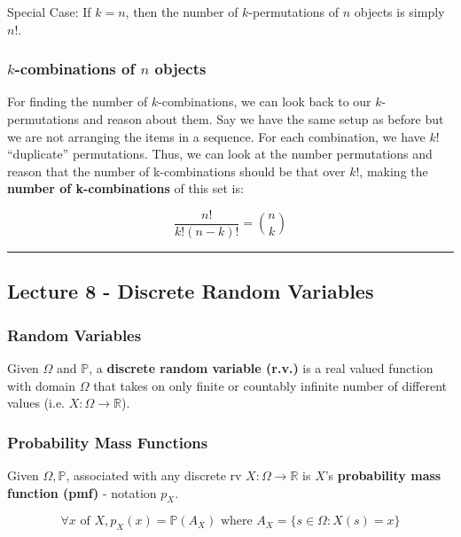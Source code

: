 \documentclass{article}
\begin{document}
Special Case: If $k = n$, then the number of $k$-permutations of $n$
objects is simply $n!$.

\bigskip
\subsubsection{$k$-combinations of $n$ objects}

For finding the number of $k$-combinations, we can look back to our
$k$-permutations and reason about them. Say we have the same setup as
before but we are not arranging the items in a sequence. For each
combination, we have $k!$ ``duplicate'' permutations. Thus, we can
look at the number permutations and reason that the number of
k-combinations should be that over $k!$, making the \textbf{number of
  k-combinations} of this set is:

\begin{equation}
  \tag{K-combinations}
  \boxed{
    \frac{n!}{k!(n-k)!} = \binom{n}{k}
  }
\end{equation}


\medskip\hrule
\subsection{Lecture 8 - Discrete Random Variables}

\subsubsection{Random Variables}

Given $\Omega$ and $\mathbb{P}$, a \textbf{discrete random variable
  (r.v.)} is a real valued function with domain $\Omega$ that takes on
only finite or countably infinite number of different values (i.e. $X
: \Omega \rightarrow \mathbb{R}$).

\subsubsection{Probability Mass Functions}

Given $\Omega, \mathbb{P}$, associated with any discrete rv $X :
\Omega \rightarrow \mathbb{R}$ is $X$'s \textbf{probability mass
  function (pmf)} - notation $p_X$.

\begin{equation}
  \tag{pmf Def}
  \boxed{
    \forall x \text{ of } X, p_X(x) = \mathbb{P}(A_X)
    \text{ where } A_X = \{s \in \Omega : X(s) = x\}
  }
\end{equation}
\end{document}
